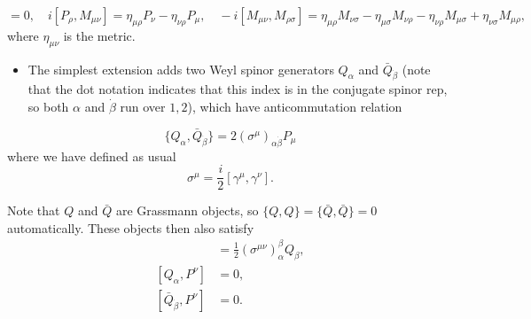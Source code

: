 \begin{equation}
    [P_\mu, P_\nu] = 0, \quad i[P_\rho, M_{\mu \nu}] = \eta_{\mu \rho}P_\nu - \eta_{\nu \rho} P_\mu, \quad -i[M_{\mu \nu}, M_{\rho \sigma}] = \eta_{\mu \rho}M_{\nu \sigma} - \eta_{\mu \sigma}M_{\nu \rho} - \eta_{\nu \rho}M_{\mu \sigma} + \eta_{\nu \sigma}M_{\mu \rho},
\end{equation}
where $\eta_{\mu \nu}$ is the metric.
\begin{itemize}
    \item The simplest extension adds two Weyl spinor generators $Q_\alpha$ and $\bar{Q}_{\dot{\beta}}$ (note that the dot notation indicates that this index is in the conjugate spinor rep, so both $\alpha$ and $\dot{\beta}$ run over $1,2$), which have anticommutation relation
\end{itemize}
\begin{equation}
    \{Q_\alpha, \bar{Q}_{\dot{\beta}}\} = 2(\sigma^\mu)_{\alpha \dot{\beta}} P_\mu
\end{equation}
where we have defined as usual
\begin{equation}
    \sigma^\mu = \frac{i}{2}[\gamma^\mu, \gamma^\nu].
\end{equation}

%
Note that $Q$ and $\bar{Q}$ are Grassmann objects, so $\{Q,Q\} = \{\bar{Q},\bar{Q}\} = 0$ automatically. These objects then also satisfy
%
\begin{align}
    [M^{\mu \nu}, Q_\alpha] &= \frac{1}{2}(\sigma^{\mu \nu})_\alpha^\beta Q_\beta, \\
    [Q_\alpha, P^\nu] &= 0, \\
    [\bar{Q}_{\dot{\beta}}, P^\nu] &= 0.
\end{align}
%

